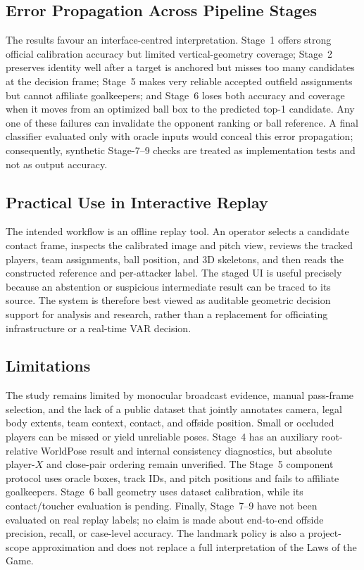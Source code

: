 \documentclass[runningheads]{llncs}
\begin{document}
\subsection{Error Propagation Across Pipeline Stages}
The results favour an interface-centred interpretation. Stage~1 offers strong official calibration accuracy but limited vertical-geometry coverage; Stage~2 preserves identity well after a target is anchored but misses too many candidates at the decision frame; Stage~5 makes very reliable accepted outfield assignments but cannot affiliate goalkeepers; and Stage~6 loses both accuracy and coverage when it moves from an optimized ball box to the predicted top-1 candidate. Any one of these failures can invalidate the opponent ranking or ball reference. A final classifier evaluated only with oracle inputs would conceal this error propagation; consequently, synthetic Stage-7--9 checks are treated as implementation tests and not as output accuracy.

\subsection{Practical Use in Interactive Replay}
The intended workflow is an offline replay tool. An operator selects a candidate contact frame, inspects the calibrated image and pitch view, reviews the tracked players, team assignments, ball position, and 3D skeletons, and then reads the constructed reference and per-attacker label. The staged UI is useful precisely because an abstention or suspicious intermediate result can be traced to its source. The system is therefore best viewed as auditable geometric decision support for analysis and research, rather than a replacement for officiating infrastructure or a real-time VAR decision.

\subsection{Limitations}
The study remains limited by monocular broadcast evidence, manual pass-frame selection, and the lack of a public dataset that jointly annotates camera, legal body extents, team context, contact, and offside position. Small or occluded players can be missed or yield unreliable poses. Stage~4 has an auxiliary root-relative WorldPose result and internal consistency diagnostics, but absolute player-$X$ and close-pair ordering remain unverified. The Stage~5 component protocol uses oracle boxes, track IDs, and pitch positions and fails to affiliate goalkeepers. Stage~6 ball geometry uses dataset calibration, while its contact/toucher evaluation is pending. Finally, Stage~7--9 have not been evaluated on real replay labels; no claim is made about end-to-end offside precision, recall, or case-level accuracy. The landmark policy is also a project-scope approximation and does not replace a full interpretation of the Laws of the Game.
\end{document}
